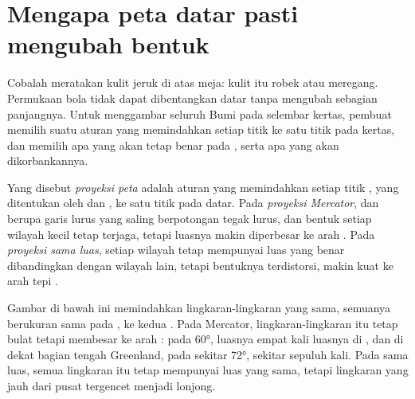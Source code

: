 \section{Mengapa peta datar pasti mengubah bentuk}

Cobalah meratakan kulit jeruk di atas meja: kulit itu robek atau
meregang. Permukaan bola tidak dapat dibentangkan datar tanpa mengubah
sebagian panjangnya. Untuk menggambar seluruh Bumi pada selembar kertas,
pembuat  memilih suatu aturan yang memindahkan setiap titik 
ke satu titik pada kertas, dan memilih apa yang akan tetap benar pada ,
serta apa yang akan dikorbankannya.

\begin{definition}\label{def:g9:maps-of-the-earth:projection}
Yang disebut \emph{proyeksi peta} adalah aturan yang
memindahkan setiap titik , yang ditentukan oleh  dan
, ke satu titik pada  datar. Pada \emph{proyeksi
Mercator},  dan  berupa garis
lurus yang saling berpotongan tegak lurus, dan bentuk setiap wilayah kecil
tetap terjaga, tetapi luasnya makin diperbesar ke arah . Pada
\emph{proyeksi sama luas}, setiap wilayah tetap
mempunyai luas yang benar dibandingkan dengan wilayah lain, tetapi
bentuknya terdistorsi, makin kuat ke arah tepi .
\end{definition}

Gambar di bawah ini memindahkan lingkaran-lingkaran yang sama, semuanya
berukuran sama pada , ke kedua . Pada  Mercator,
lingkaran-lingkaran itu tetap bulat tetapi membesar ke arah : pada
 \ang{60}, luasnya empat kali luasnya di , dan di
dekat bagian tengah Greenland, pada sekitar \ang{72}, sekitar sepuluh kali.
Pada  sama luas, semua lingkaran itu tetap mempunyai luas yang sama,
tetapi lingkaran yang jauh dari pusat  tergencet menjadi lonjong.


